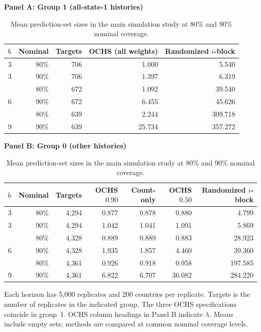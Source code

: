 \begin{table}[!htbp]
\centering
\caption{Mean prediction-set sizes in the main simulation study at
80\% and 90\% nominal coverage.}
\label{tab:results-size}
\begingroup
\small
\setlength{\tabcolsep}{5pt}
\renewcommand{\arraystretch}{1.08}

\textbf{Panel A: Group 1 (all-state-1 histories)}\\[3pt]
\begin{tabular}{@{}rrrrr@{}}
\toprule
$h$ & Nominal & Targets & OCHS (all weights) & Randomized $i$-block \\
\midrule
3 & 80\% & 706 & 1.000 & 5.540 \\
3 & 90\% & 706 & 1.397 & 6.319 \\
\addlinespace[3pt]
6 & 80\% & 672 & 1.092 & 39.540 \\
6 & 90\% & 672 & 6.455 & 45.626 \\
\addlinespace[3pt]
9 & 80\% & 639 & 2.244 & 309.718 \\
9 & 90\% & 639 & 25.734 & 357.272 \\
\bottomrule
\end{tabular}

\par\vspace{10pt}
\textbf{Panel B: Group 0 (other histories)}\\[3pt]
\begin{tabular}{@{}rrrrrrr@{}}
\toprule
$h$ & Nominal & Targets & OCHS $0.90$ & Count-only
    & OCHS $0.50$ & Randomized $i$-block \\
\midrule
3 & 80\% & 4,294 & 0.877 & 0.878 & 0.880 & 4.799 \\
3 & 90\% & 4,294 & 1.042 & 1.041 & 1.091 & 5.869 \\
\addlinespace[3pt]
6 & 80\% & 4,328 & 0.889 & 0.889 & 0.883 & 28.923 \\
6 & 90\% & 4,328 & 1.935 & 1.857 & 4.460 & 39.360 \\
\addlinespace[3pt]
9 & 80\% & 4,361 & 0.926 & 0.918 & 0.958 & 197.585 \\
9 & 90\% & 4,361 & 6.822 & 6.707 & 36.082 & 284.220 \\
\bottomrule
\end{tabular}

\par\vspace{6pt}
\begin{minipage}{0.97\linewidth}
\footnotesize
Each horizon has 5,000 replicates and 200 countries per replicate.
Targets is the number of replicates in the indicated group. The
three OCHS specifications coincide in group~1. OCHS column headings
in Panel B indicate $\lambda$. Means include empty sets; methods
are compared at common nominal coverage levels.
\end{minipage}
\endgroup
\end{table}
